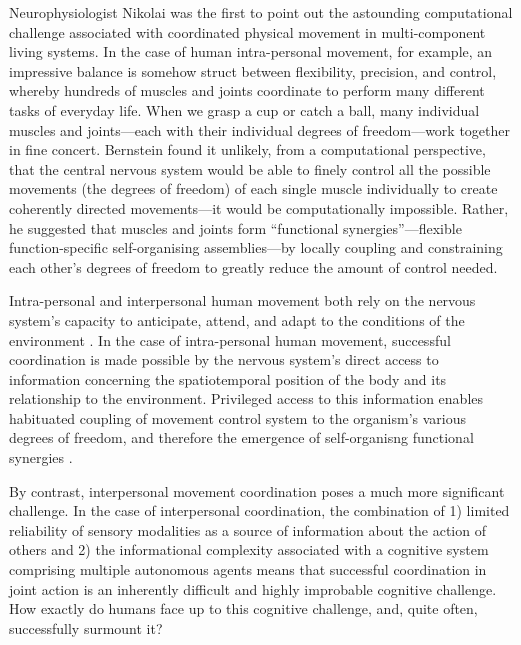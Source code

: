 \begin{CJK}{UTF8}{gbsn}
Neurophysiologist Nikolai \textcite{Bernstein1967} was the first to point out the astounding computational challenge associated with coordinated physical movement in multi-component living systems.  In the case of human intra-personal movement, for example, an impressive balance is somehow struct between flexibility, precision, and control, whereby hundreds of muscles and joints coordinate to perform many different tasks of everyday life.  When we grasp a cup or catch a ball, many individual muscles and joints---each with their individual degrees of freedom---work together in fine concert.  Bernstein found it unlikely, from a computational perspective, that the central nervous system would be able to finely control all the possible movements (the degrees of freedom) of each single muscle individually to create coherently directed movements---it would be computationally impossible.  Rather, he suggested that muscles and joints form  ``functional synergies''---flexible function-specific self-organising assemblies---by locally coupling and constraining each other’s degrees of freedom to greatly reduce the amount of control needed.

Intra-personal and interpersonal human movement both rely on the nervous system’s capacity to anticipate, attend, and adapt to the conditions of the environment \citep{Keller2014}.  In the case of intra-personal human movement, successful coordination is made possible by the nervous system's direct access to information concerning the spatiotemporal position of the body and its relationship to the environment.  Privileged access to this information enables habituated coupling of movement control system to the organism's various degrees of freedom, and therefore the emergence of self-organisng functional synergies \citep{Riley2011}.

By contrast, interpersonal movement coordination poses a much more significant challenge.  In the case of interpersonal coordination, the combination of 1) limited reliability of sensory modalities as a source of information about the action of others \citep{Wilson2005,Wolpert2003,Frith2007} and 2) the informational complexity associated with a cognitive system comprising multiple autonomous agents \citep{Bernstein1967} means that successful coordination in joint action is an inherently difficult and highly improbable cognitive challenge.  How exactly do humans face up to this cognitive challenge, and, quite often, successfully surmount it?


\end{CJK}
